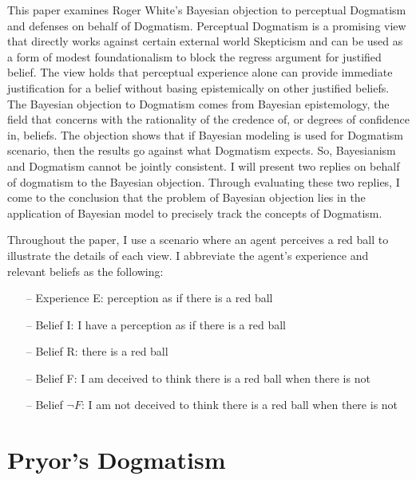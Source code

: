 This paper examines Roger White's Bayesian objection to perceptual
Dogmatism and defenses on behalf of Dogmatism. Perceptual Dogmatism is a
promising view that directly works against certain external world
Skepticism and can be used as a form of modest foundationalism to block
the regress argument for justified belief. The view holds that
perceptual experience alone can provide immediate justification for a
belief without basing epistemically on other justified beliefs. The
Bayesian objection to Dogmatism comes from Bayesian epistemology, the
field that concerns with the rationality of the credence of, or degrees
of confidence in, beliefs. The objection shows that if Bayesian modeling
is used for Dogmatism scenario, then the results go against what
Dogmatism expects. So, Bayesianism and Dogmatism cannot be jointly
consistent. I will present two replies on behalf of dogmatism to the
Bayesian objection. Through evaluating these two replies, I come to the
conclusion that the problem of Bayesian objection lies in the
application of Bayesian model to precisely track the concepts of
Dogmatism.

Throughout the paper, I use a scenario where an agent perceives a red
ball to illustrate the details of each view. I abbreviate the agent's
experience and relevant beliefs as the following:
\begin{itemize}
	\item[--] Experience E: perception as if there is a red ball

	\item[--] Belief I: I have a perception as if there is a red ball

	\item[--] Belief R: there is a red ball

	\item[--] Belief F: I am deceived to think there is a red ball when there is not

	\item[--] Belief \(\neg F\): I am not deceived to think there is a red ball when
there is not
\end{itemize}


\section{Pryor's Dogmatism}

